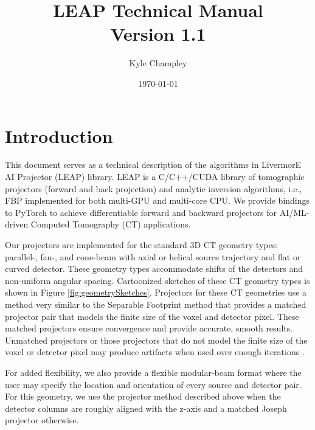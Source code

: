 \documentclass[11pt]{article}
\title{LEAP Technical Manual \\ Version 1.1}
\author{Kyle Champley}
\date{\today}
\begin{document}
\newcommand{\B}[1]{\textbf{#1}}
\newcommand{\ra}{\rightarrow}
\newcommand{\sinc}{\text{sinc}}
\newcommand{\supp}{\text{supp}}
\newcommand{\suppe}{\text{supp}_{\varepsilon}}
\newcommand{\ind}{\B{1}}
\newcommand{\sgn}{\text{sgn}}
\newcommand{\etal}{\text{et al. }}
\newcommand{\Beta}{{\boldsymbol\beta}}
\newcommand{\Radon}{\mathcal{R}}
\newcommand{\Xray}{\mathcal{P}}
\newcommand{\Fourier}{\mathcal{F}}
\newcommand{\Hilbert}{\mathcal{H}}
\newcommand{\Identity}{\mathcal{I}}
\newcommand{\BL}{\mathcal{L}}
\newcommand{\R}{\mathcal{R}}
\newcommand{\Cov}{\text{Cov}}
\newcommand{\argmin}{\operatorname{argmin}}


\maketitle

\newpage
\tableofcontents
\newpage

\section{Introduction}

This document serves as a technical description of the algorithms in LivermorE AI Projector (LEAP) library.  LEAP is a C/C++/CUDA library of tomographic projectors (forward and back projection) and analytic inversion algorithms, i.e., FBP implemented for both multi-GPU and multi-core CPU. We provide bindings to PyTorch to achieve differentiable forward and backward projectors for AI/ML-driven Computed Tomography (CT) applications.

Our projectors are implemented for the standard 3D CT geometry types: parallel-, fan-, and cone-beam with axial or helical source trajectory and flat or curved detector. These geometry types accommodate shifts of the detectors and non-uniform angular spacing. Cartoonized sketches of these CT geometry types is shown in Figure \ref{fig:geometrySketches}. Projectors for these CT geometries use a method very similar to the Separable Footprint method \cite{Long_TMI_2010} that provides a matched projector pair that models the finite size of the voxel and detector pixel. These matched projectors ensure convergence and provide accurate, smooth results. Unmatched projectors or those projectors that do not model the finite size of the voxel or detector pixel may produce artifacts when used over enough iterations \cite{DeManBasu_PMB_2004}.

For added flexibility, we also provide a flexible modular-beam format where the user may specify the location and orientation of every source and detector pair.  For this geometry, we use the projector method described above when the detector columns are roughly aligned with the z-axis and a matched Joseph projector \cite{Joseph_TMI_1982} otherwise.
\end{document}
